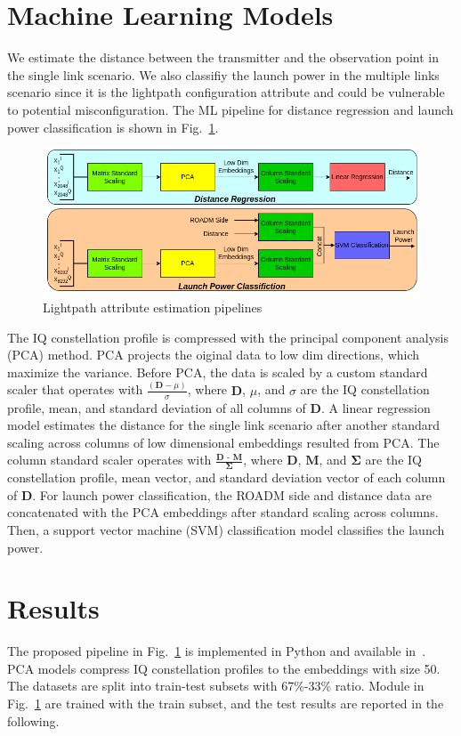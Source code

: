 \documentclass[lettersize,journal, one-column]{IEEEtran}
\begin{document}
\section{Machine Learning Models}
\label{section:ml_models}
We estimate the distance between the transmitter and the observation point in the single link scenario.
We also classifiy the launch power in the multiple links scenario since it is the lightpath configuration attribute and could be vulnerable to potential misconfiguration.
The ML pipeline for distance regression and launch power classification is shown in Fig.~\ref{figure:models}.
\begin{figure}
	\centering
    \includegraphics[width=\columnwidth]{figures/models.png}
    \caption{Lightpath attribute estimation pipelines}
	\label{figure:models}
\end{figure}
The IQ constellation profile is compressed with the principal component analysis (PCA) method.
PCA projects the oiginal data to low dim directions, which maximize the variance.
Before PCA, the data is scaled by a custom standard scaler that operates with $\frac{(\textbf{D}-\mu)}{\sigma}$, where $\textbf{D}$, $\mu$, and $\sigma$ are the IQ constellation profile, mean, and standard deviation of all columns of $\textbf{D}$.
A linear regression model estimates the distance for the single link scenario after another standard scaling across columns of low dimensional embeddings resulted from PCA.
The column standard scaler operates with $\frac{\textbf{D - M}}{\mathbf{\Sigma}}$, where $\textbf{D}$, $\textbf{M}$, and $\mathbf{\Sigma}$ are the IQ constellation profile, mean vector, and standard deviation vector of each column of $\textbf{D}$.
For launch power classification, the ROADM side and distance data are concatenated with the PCA embeddings after standard scaling across columns.
Then, a support vector machine (SVM) classification model classifies the launch power.

\section{Results}
\label{section:results}
The proposed pipeline in Fig.~\ref{figure:models} is implemented in Python and available in~\cite{code}.
PCA models compress IQ constellation profiles to the embeddings with size 50.
The datasets are split into train-test subsets with 67\%-33\% ratio.
Module in Fig.~\ref{figure:models} are trained with the train subset, and the test results are reported in the following.
\end{document}
